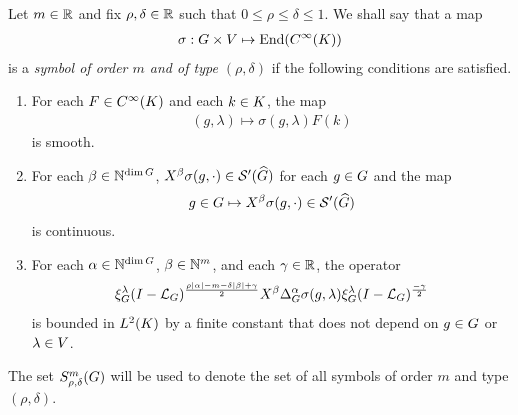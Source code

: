 \begin{definition}
\label{definition:symbol_classes}
    Let $m \in \mathbb{R}$ and fix $\rho, \delta \in \mathbb{R}$ such that $0 \leq \rho \leq \delta \leq 1$.
    We shall say that a map
    \begin{align*}
        \sigma : G \times V \mapsto \operatorname{End}({C^\infty(K)})
    \end{align*}
    is a \emph{symbol of order $m$ and of type $(\rho, \delta)$} if the following conditions are satisfied.
    \begin{enumerate}
        \item
            For each $F \in {C^\infty(K)}$ and each $k \in K$,
            the map
            \begin{align*}
                (g, \lambda) \mapsto \sigma(g, \lambda) F(k)
            \end{align*}
            is smooth.
        \item
            For each $\beta \in \mathbb{N}^{\dim G}$,
            $\LeftDifferentialOperator \beta \sigma(g, \dummy) \in \TemperedDistributions {\dualGroup \Group}$
            for each $g \in G$ and the map
            \begin{align*}
                g \in \Group \mapsto \LeftDifferentialOperator \beta \sigma(g, \dummy) \in \TemperedDistributions {\dualGroup \Group}
            \end{align*}
            is continuous.
        \item \label{item:symbol_bound_condition}
            For each $\alpha \in \mathbb{N}^{\dim G}$, $\beta \in \mathbb{N}^m$, and each $\gamma \in \mathbb{R}$,
            the operator
            \begin{align*}
                \Rep{\lambda} \BesselPotential{\rho \abs\alpha - m - \delta \abs\beta + \gamma} \LeftDifferentialOperator{\beta} \DifferenceOperatorOrder{\alpha} \sigma(g, \lambda) \Rep{\lambda} \BesselPotential{-\gamma}
            \end{align*}
            is bounded in ${L^{2} (K)}$ by a finite constant that does not depend on $g \in G$ or $\lambda \in V$.
    \end{enumerate}

    The set $S^{m}_{\rho, \delta}(G)$ will be used to denote the set of all symbols of order $m$ and type $(\rho, \delta)$.
\end{definition}

